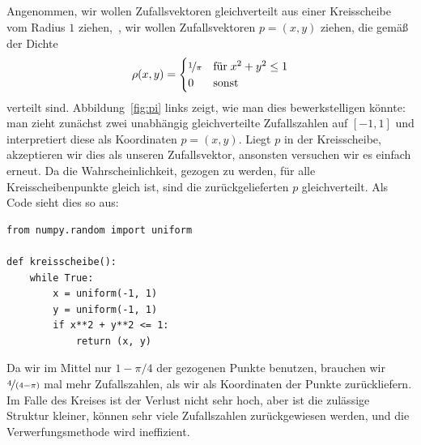 \subsection{}

Angenommen, wir wollen Zufallsvektoren gleichverteilt aus einer
Kreisscheibe vom Radius $1$ ziehen, \dh\,, wir wollen Zufallsvektoren
$p=(x,y)$ ziehen, die gemäß der Dichte
\begin{equation}
  \rho(x, y) = \begin{cases}
    \nicefrac{1}{\pi} & \text{für}\; x^2+y^2\le 1\\
    0     & \text{sonst}
  \end{cases}
\end{equation}
verteilt sind.  Abbildung~\ref{fig:pi} links zeigt, wie man dies
bewerkstelligen könnte: man zieht zunächst zwei unabhängig
gleichverteilte Zufallszahlen auf $[-1,1]$ und interpretiert diese als
Koordinaten $p = (x, y)$. Liegt $p$ in der Kreisscheibe, akzeptieren
wir dies als unseren Zufallsvektor, ansonsten versuchen wir es einfach
erneut. Da die Wahrscheinlichkeit, gezogen zu werden, für alle
Kreisscheibenpunkte gleich ist, sind die zurückgelieferten $p$
gleichverteilt. Als Code sieht dies so aus:
\begin{lstlisting}
from numpy.random import uniform

def kreisscheibe():
    while True:
        x = uniform(-1, 1)
        y = uniform(-1, 1)
        if x**2 + y**2 <= 1:
            return (x, y)
\end{lstlisting}
Da wir im Mittel nur $1-\pi/4$ der gezogenen Punkte benutzen, brauchen
wir $\nicefrac{4}{(4-\pi)}$ mal mehr Zufallszahlen, als wir als
Koordinaten der Punkte zurückliefern. Im Falle des Kreises ist der
Verlust nicht sehr hoch, aber ist die zulässige Struktur kleiner,
können sehr viele Zufallszahlen zurückgewiesen werden, und die
Verwerfungsmethode wird ineffizient.


